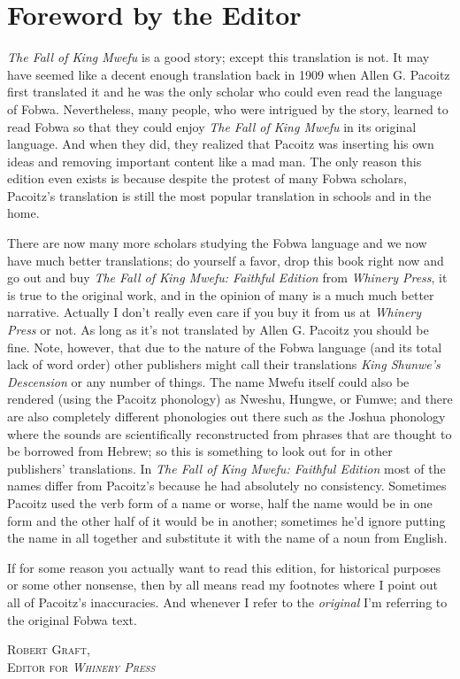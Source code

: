 \documentclass[openleft, twoside, 14pt, extrafontsizes]{memoir}
\begin{document}
\chapter*{Foreword by the Editor}
\emph{The Fall of King Mwefu} is a good story; except this translation is not.
It may have seemed like a decent enough translation back in 1909 when Allen G. Pacoitz first translated it and he was the only scholar who could even read the language of Fo\-bwa.
Nevertheless, many people, who were intrigued by the story, learned to read Fo\-bwa so that they could enjoy \emph{The Fall of King Mwefu} in its original language.
And when they did, they realized that Pacoitz was inserting his own ideas and removing important content like a mad man.
The only reason this edition even exists is because despite the protest of many Fo\-bwa scholars, Pacoitz's translation is still the most popular translation in schools and in the home. 

There are now many more scholars studying the Fo\-bwa language and we now have much better translations;
do yourself a favor, drop this book right now and go out and buy \emph{The Fall of King Mwefu: Faithful Edition} from \emph{Whinery Press}, it is true to the original work, and in the opinion of many is a much much better narrative.
Actually I don't really even care if you buy it from us at \emph{Whinery Press} or not.
As long as it's not translated by Allen G. Pacoitz you should be fine.
Note, however, that due to the nature of the Fo\-bwa language (and its total lack of word order) other publishers might call their translations \emph{King Shunwe's Descension} or any number of things. The name Mwefu itself could also be rendered (using the Pacoitz phonology) as Nweshu, Hungwe, or Fumwe; and there are also completely different phonologies out there such as the Joshua phonology where the sounds are scientifically reconstructed from phrases that are thought to be borrowed from Hebrew; so this is something to look out for in other publishers' translations. In \emph{The Fall of King Mwefu: Faithful Edition} most of the names differ from Pacoitz's because he had absolutely no consistency. Sometimes Pacoitz used the verb form of a name or worse, half the name would be in one form and the other half of it would be in another; sometimes he'd ignore putting the name in all together and substitute it with the name of a noun from English.

If for some reason you actually want to read this edition, for historical purposes or some other nonsense, then by all means read my footnotes where I point out all of Pacoitz's inaccuracies. And whenever I refer to the \emph{original} I'm referring to the original Fo\-bwa text.
\begin{flushright}
\textsc{
Robert Graft,\\
Editor for \emph{Whinery Press}}
\end{flushright}
\end{document}

